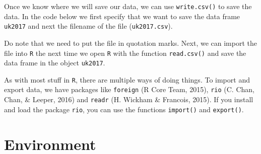 \documentclass[12pt,oneside]{reedthesis}
\theoremstyle{definition}
\theoremstyle{definition}
\theoremstyle{definition}
\theoremstyle{remark}
\begin{document}
  Once we know where we will save our data, we can use
  \texttt{write.csv()} to save the data. In the code below we first
  specify that we want to save the data frame \texttt{uk2017} and next the
  filename of the file (\texttt{uk2017.csv}).
  \begin{Shaded}
  \begin{Highlighting}[]
  \NormalTok{)}
  \end{Highlighting}
  \end{Shaded}
  Do note that we need to put the file in quotation marks. Next, we can
  import the file into \texttt{R} the next time we open \texttt{R} with
  the function \texttt{read.csv()} and save the data frame in the object
  \texttt{uk2017}.
  \begin{Shaded}
  \begin{Highlighting}[]
  \StringTok{ }\NormalTok{(}\NormalTok{)}
  \end{Highlighting}
  \end{Shaded}
  As with most stuff in \texttt{R}, there are multiple ways of doing
  things. To import and export data, we have packages like
  \texttt{foreign} (R Core Team, 2015), \texttt{rio} (C. Chan, Chan, \&
  Leeper, 2016) and \texttt{readr} (H. Wickham \& Francois, 2015). If you
  install and load the package \texttt{rio}, you can use the functions
  \texttt{import()} and \texttt{export()}.
  \begin{Shaded}
  \begin{Highlighting}[]
  \NormalTok{)}
  
  \StringTok{ }\NormalTok{(}\NormalTok{)}
  \end{Highlighting}
  \end{Shaded}
  \section{Environment}\label{environment}
  
\end{document}

